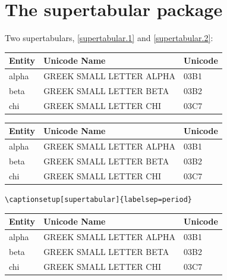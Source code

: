 \documentclass{article}
\newcommand*\captionsetup[2][]{}
\begin{document}
\section{The supertabular package}

Two supertabulars, \ref{supertabular.1} and \ref{supertabular.2}:

\begin{center}
\begin{supertabular}{lll}
\bfseries Entity&\bfseries  Unicode Name&\bfseries  Unicode\\
\hline
alpha              & GREEK SMALL LETTER ALPHA            & 03B1\\
beta               & GREEK SMALL LETTER BETA             & 03B2\\
chi                & GREEK SMALL LETTER CHI              & 03C7\\
\end{supertabular}
\end{center}

\begin{center}
\begin{supertabular}{lll}
\bfseries Entity&\bfseries  Unicode Name&\bfseries  Unicode\\
\hline
alpha              & GREEK SMALL LETTER ALPHA            & 03B1\\
beta               & GREEK SMALL LETTER BETA             & 03B2\\
chi                & GREEK SMALL LETTER CHI              & 03C7\\
\end{supertabular}
\end{center}

\verb|\captionsetup[supertabular]{labelsep=period}|
\captionsetup[supertabular]{labelsep=period}

\begin{center}
\begin{supertabular}{lll}
\bfseries Entity&\bfseries  Unicode Name&\bfseries  Unicode\\
\hline
alpha              & GREEK SMALL LETTER ALPHA            & 03B1\\
beta               & GREEK SMALL LETTER BETA             & 03B2\\
chi                & GREEK SMALL LETTER CHI              & 03C7\\
\end{supertabular}
\end{center}
\end{document}
